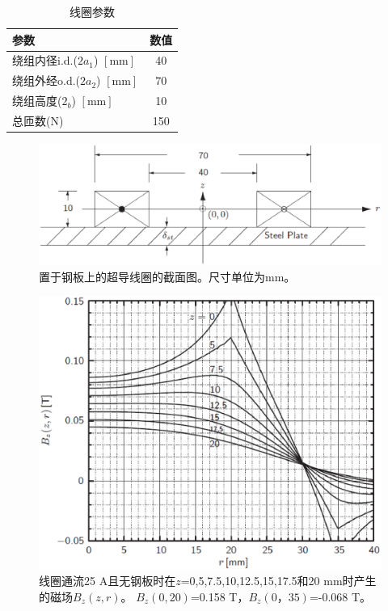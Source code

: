 \begin{table}[htbp]\small
\centering
\caption{线圈参数}  
\begin{tabular}{|l|c|}
\hline
参数 & 数值 \\ \hline
绕组内径i.d.($2a_1$) $\left[\mathrm{mm}\right]$ & 40 \\ \hline
绕组外经o.d.($2a_2$) $\left[\mathrm{mm}\right]$ & 70 \\ \hline
绕组高度($2_b$) $\left[\mathrm{mm}\right]$ & 10 \\ \hline
总匝数(N) & 150 \\ \hline
\end{tabular}
\end{table}



\begin{figure}
	\centering
	\includegraphics[scale=0.5]{chpt9/figs/fig9.6.eps}
	\caption{置于钢板上的超导线圈的截面图。尺寸单位为mm。}
\end{figure}


\begin{figure}
	\centering
	\includegraphics[scale=0.5]{chpt9/figs/fig9.7.eps}
	\caption{线圈通流25 A且无钢板时在$z$=0,5,7.5,10,12.5,15,17.5和20 mm时产生的磁场$B_z(z,r)$。
		$B_z(0,20)$=0.158 T，$B_z(0，35)$=-0.068 T。}
\end{figure}

